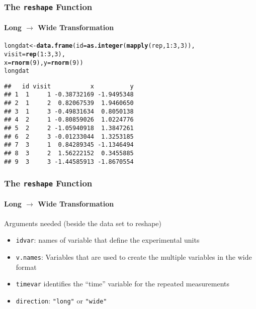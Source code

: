\documentclass[paper=screen,mathserif]{beamer}\usepackage[]{graphicx}\usepackage[]{color}
\makeatletter
\newcommand{\hlnum}[1]{\textcolor[rgb]{0.686,0.059,0.569}{#1}}%
\newcommand{\hlopt}[1]{\textcolor[rgb]{0,0,0}{#1}}%
\newcommand{\hlstd}[1]{\textcolor[rgb]{0.345,0.345,0.345}{#1}}%
\newcommand{\hlkwb}[1]{\textcolor[rgb]{0.69,0.353,0.396}{#1}}%
\newcommand{\hlkwc}[1]{\textcolor[rgb]{0.333,0.667,0.333}{#1}}%
\newcommand{\hlkwd}[1]{\textcolor[rgb]{0.737,0.353,0.396}{\textbf{#1}}}%
\newenvironment{kframe}{%
 \def\at@end@of@kframe{}%
 \ifinner\ifhmode%
  \def\at@end@of@kframe{\end{minipage}}%
  \begin{minipage}{\columnwidth}%
 \fi\fi%
 \def\FrameCommand##1{\hskip\@totalleftmargin \hskip-\fboxsep
 \colorbox{shadecolor}{##1}\hskip-\fboxsep
     \hskip-\linewidth \hskip-\@totalleftmargin \hskip\columnwidth}%
 \MakeFramed {\advance\hsize-\width
   \@totalleftmargin\z@ \linewidth\hsize
   \@setminipage}}%
 {\par\unskip\endMakeFramed%
 \at@end@of@kframe}
\newenvironment{knitrout}{}{} %
\newcommand{\ft}[1]{\frametitle{#1}}
\newcommand{\fst}[1]{\framesubtitle{#1}}
\makeatother
\begin{document}
\begin{frame}[fragile]
  \ft{The {\tt reshape} Function}
  \fst{Long $\rightarrow$ Wide Transformation}

\begin{knitrout}\scriptsize
{}\color{fgcolor}\begin{kframe}
\begin{alltt}
\hlstd{longdat} \hlkwb{<-} \hlkwd{data.frame}\hlstd{(}\hlkwc{id} \hlstd{=} \hlkwd{as.integer}\hlstd{(}\hlkwd{mapply}\hlstd{(rep,} \hlnum{1}\hlopt{:}\hlnum{3}\hlstd{,} \hlnum{3}\hlstd{)),}
                      \hlkwc{visit} \hlstd{=} \hlkwd{rep}\hlstd{(}\hlnum{1}\hlopt{:}\hlnum{3}\hlstd{,} \hlnum{3}\hlstd{),}
                      \hlkwc{x} \hlstd{=} \hlkwd{rnorm}\hlstd{(}\hlnum{9}\hlstd{),} \hlkwc{y} \hlstd{=} \hlkwd{rnorm}\hlstd{(}\hlnum{9}\hlstd{))}
\hlstd{longdat}
\end{alltt}
\begin{verbatim}
##   id visit           x          y
## 1  1     1 -0.38732169 -1.9495348
## 2  1     2  0.82067539  1.9460650
## 3  1     3 -0.49831634  0.8050138
## 4  2     1 -0.80859026  1.0224776
## 5  2     2 -1.05940918  1.3847261
## 6  2     3 -0.01233044  1.3253185
## 7  3     1  0.84289345 -1.1346494
## 8  3     2  1.56222152  0.3455885
## 9  3     3 -1.44585913 -1.8670554
\end{verbatim}
\end{kframe}
\end{knitrout}

\end{frame}

\begin{frame}[fragile]
  \ft{The {\tt reshape} Function}
  \fst{Long $\rightarrow$ Wide Transformation}
  
  Arguments needed (beside the data set to reshape)
  \begin{itemize}
  \item \verb=idvar=: names of variable that define the experimental
    units
  \item \verb=v.names=: Variables that are used to create the multiple
    variables in the wide format
  \item \verb=timevar= identifies the ``time'' variable for the
    repeated measurements
  \item \verb=direction=: \verb="long"= or \verb="wide"=
  \end{itemize}

\end{frame}
\end{document}
